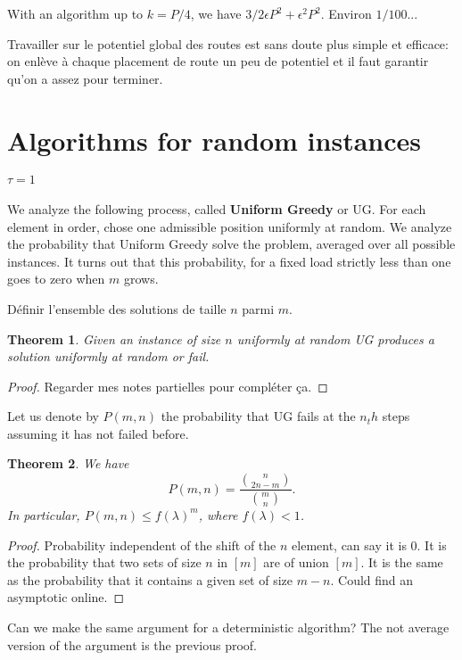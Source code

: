 \documentclass[10pt, conference, letterpaper]{IEEEtran}
\newtheorem{theorem}{Theorem}
\begin{document}
With an algorithm up to $k=P/4$, we have $3/2 \epsilon P^2 + \epsilon^2 P^2$. Environ $1/100$...

Travailler sur le potentiel global des routes est sans doute plus simple et efficace: on enlève à chaque placement de route un peu de potentiel et il faut garantir qu'on a assez pour terminer.


\section{Algorithms for random instances}

\paragraph{$\tau = 1$}

We analyze the following process, called \textbf{Uniform Greedy} or UG.
For each element in order, chose one admissible position
uniformly at random. We analyze the probability that Uniform Greedy
solve the problem, averaged over all possible instances. 
It turns out that this probability, for a fixed load strictly less than one goes to zero when $m$ grows. 

Définir l'ensemble des solutions de taille $n$ parmi $m$.
\begin{theorem}
Given an instance of size $n$ uniformly at random UG
produces a solution uniformly at random or fail.
\end{theorem}
\begin{proof}
Regarder mes notes partielles pour compléter ça.
\end{proof}

Let us denote by $P(m,n)$ the probability that UG fails at the $n_th$
steps assuming it has not failed before.

\begin{theorem}
We have $$P(m,n) = \frac{\binom{n}{2n-m}}{\binom{m}{n}}.$$
In particular, $P(m,n) \leq f(\lambda)^m$, where $f(\lambda) < 1$.
\end{theorem}
\begin{proof}
Probability independent of the shift of the $n$ element, can say it is $0$.
It is the probability that two sets of size $n$ in $[m]$ are of union $[m]$.
It is the same as the probability that it contains a given set of size $m-n$.
Could find an asymptotic online.
\end{proof}

Can we make the same argument for a deterministic algorithm?
The not average version of the argument is the previous proof.
\end{document}
